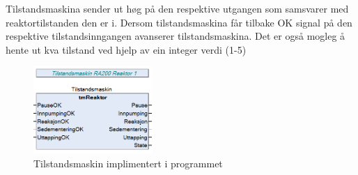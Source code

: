 Tilstandsmaskina sender ut høg på den respektive utgangen som samsvarer med reaktortilstanden den er i. Dersom tilstandsmaskina får tilbake
OK signal på den respektive tilstandsinngangen avanserer tilstandsmaskina.
Det er også mogleg å hente ut kva tilstand ved hjelp av ein integer verdi (1-5)

\begin{figure}[htbp]
    \centering
    \includegraphics[width=0.4\textwidth]{Bilder/Tilstandsmaskin.png}
    \caption{Tilstandsmaskin implimentert i programmet}\label{fig:TilstandsmaskinIProgram}
\end{figure}


